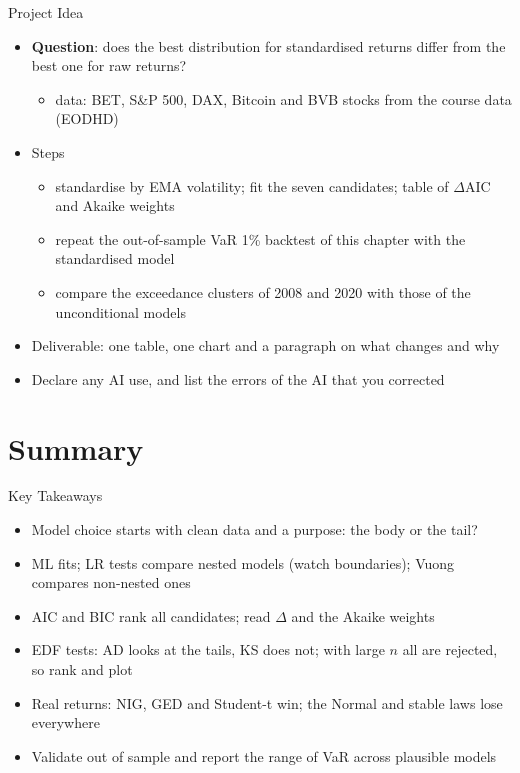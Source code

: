 \begin{frame}{Project Idea}
\itemsize{\small}
\begin{itemize}
    \item \textbf{Question}: does the best distribution for standardised returns differ from the best one for raw returns?
    \begin{itemize}
        \item data: BET, S\&P 500, DAX, Bitcoin and BVB stocks from the course data (EODHD)
    \end{itemize}
    \item Steps
    \begin{itemize}
        \item standardise by EMA volatility; fit the seven candidates; table of $\Delta$AIC and Akaike weights
        \item repeat the out-of-sample VaR 1\% backtest of this chapter with the standardised model
        \item compare the exceedance clusters of 2008 and 2020 with those of the unconditional models
    \end{itemize}
    \item Deliverable: one table, one chart and a paragraph on what changes and why
    \item Declare any AI use, and list the errors of the AI that you corrected
\end{itemize}
\end{frame}


\section{Summary}

\begin{frame}{Key Takeaways}
\itemsize{\small}
\begin{itemize}
    \item Model choice starts with clean data and a purpose: the body or the tail?
    \item ML fits; LR tests compare nested models (watch boundaries); Vuong compares non-nested ones
    \item AIC and BIC rank all candidates; read $\Delta$ and the Akaike weights
    \item EDF tests: AD looks at the tails, KS does not; with large $n$ all are rejected, so rank and plot
    \item Real returns: NIG, GED and Student-t win; the Normal and stable laws lose everywhere
    \item Validate out of sample and report the range of VaR across plausible models
\end{itemize}
\end{frame}


